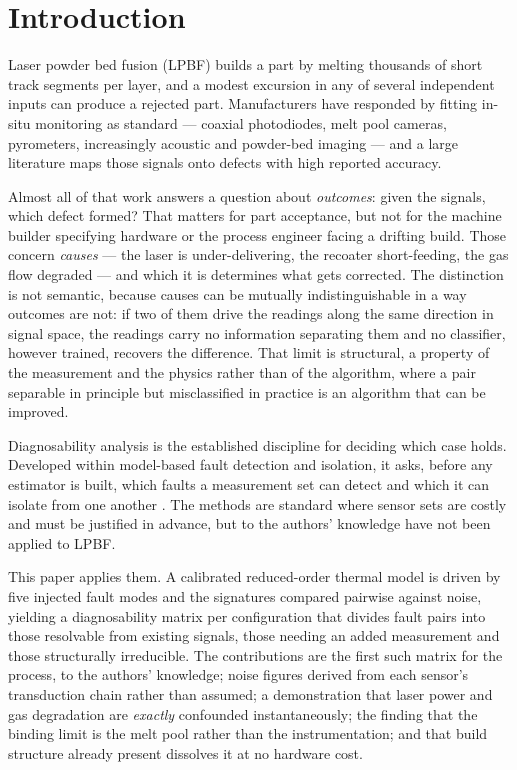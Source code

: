 \documentclass[final,5p,times,twocolumn]{elsarticle}
\begin{document}
\section{Introduction}

Laser powder bed fusion (LPBF) builds a part by melting thousands of short track
segments per layer, and a modest excursion in any of several independent inputs
can produce a rejected part. Manufacturers have responded by fitting in-situ
monitoring as standard --- coaxial photodiodes, melt pool cameras, pyrometers,
increasingly acoustic and powder-bed imaging --- and a large literature maps
those signals onto defects with high reported accuracy.

Almost all of that work answers a question about \emph{outcomes}: given the
signals, which defect formed? That matters for part acceptance, but not for the
machine builder specifying hardware or the process engineer facing a drifting
build. Those concern \emph{causes} --- the laser is under-delivering, the
recoater short-feeding, the gas flow degraded --- and which it is determines what
gets corrected. The distinction is not semantic, because causes can be mutually
indistinguishable in a way outcomes are not: if two of them drive the readings
along the same direction in signal space, the readings carry no information
separating them and no classifier, however trained, recovers the difference. That
limit is structural, a property of the measurement and the physics rather than of
the algorithm, where a pair separable in principle but misclassified in practice
is an algorithm that can be improved.

Diagnosability analysis is the established discipline for deciding which case
holds. Developed within model-based fault detection and isolation, it asks,
before any estimator is built, which faults a measurement set can detect and
which it can isolate from one another \cite{Krysander2008}. The methods
are standard where sensor sets are costly and must be justified in advance, but
to the authors' knowledge have not been applied to LPBF.

This paper applies them. A calibrated reduced-order thermal model is driven by
five injected fault modes and the signatures compared pairwise against noise,
yielding a diagnosability matrix per configuration that divides fault pairs into
those resolvable from existing signals, those needing an added measurement and
those structurally irreducible. The contributions are the first such matrix for
the process, to the authors' knowledge; noise figures derived from each sensor's
transduction chain rather than assumed; a demonstration that laser power and gas
degradation are \emph{exactly} confounded instantaneously; the finding that the
binding limit is the melt pool rather than the instrumentation; and that build
structure already present dissolves it at no hardware cost.
\end{document}
